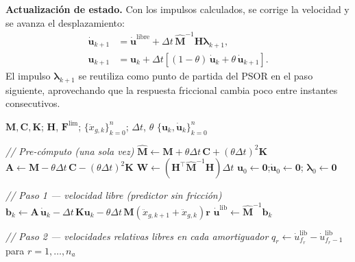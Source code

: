 \documentclass[preprint,12pt,authoryear]{elsarticle}
\begin{document}
\textbf{Actualización de estado.}
Con los impulsos calculados, se corrige la velocidad y se avanza el
desplazamiento:
\begin{align}
    \dot{\bm{u}}_{k+1} &= \dot{\bm{u}}^{\mathrm{libre}}
        + \Delta t\,\hat{\bm{M}}^{-1}\bm{H}\bm{\lambda}_{k+1}, \label{eq:vupdate}\\
    \bm{u}_{k+1} &= \bm{u}_k
        + \Delta t\!\left[(1-\theta)\,\dot{\bm{u}}_k
                         + \theta\,\dot{\bm{u}}_{k+1}\right]. \label{eq:uupdate}
\end{align}
El impulso $\bm{\lambda}_{k+1}$ se reutiliza como punto de partida del PSOR
en el paso siguiente, aprovechando que la respuesta friccional cambia poco
entre instantes consecutivos.

\begin{algorithm}[t]
\caption{NSD-LCP-PSOR aplicado a marcos MDOF con AFR}
\label{alg:nsd-lcp-psor}
\begin{algorithmic}[1]
\Require $\bm{M},\bm{C},\bm{K}$; $\bm{H}$, $\bm{F}^{\lim}$;
         $\{\ddot{x}_{g,k}\}_{k=0}^{n}$; $\Delta t$, $\theta$
\Ensure  $\{\bm{u}_k,\dot{\bm{u}}_k\}_{k=0}^{n}$

\vspace{2pt}
\State \textit{// Pre-cómputo (una sola vez)}
\State $\hat{\bm{M}} \leftarrow \bm{M} + \theta\Delta t\,\bm{C} + (\theta\Delta t)^{2}\bm{K}$
\State $\bm{A} \leftarrow \bm{M} - \theta\Delta t\,\bm{C} - (\theta\Delta t)^{2}\bm{K}$
\State $\bm{W} \leftarrow \left(\bm{H}^{\top}\hat{\bm{M}}^{-1}\bm{H}\right)\Delta t$
\State $\bm{u}_0 \leftarrow \bm{0}$;\quad $\dot{\bm{u}}_0 \leftarrow \bm{0}$;\quad
       $\bm{\lambda}_0 \leftarrow \bm{0}$

\vspace{2pt}
    \vspace{2pt}
    \State \textit{// Paso 1 — velocidad libre (predictor sin fricción)}
    \State $\bm{b}_k \leftarrow \bm{A}\,\dot{\bm{u}}_k
            - \Delta t\,\bm{K}\bm{u}_k
            - \theta\Delta t\,\bm{M}
              \!\left(\ddot{x}_{g,k+1}+\ddot{x}_{g,k}\right)\bm{r}$
    \State $\dot{\bm{u}}^{\mathrm{lib}} \leftarrow \hat{\bm{M}}^{-1}\bm{b}_k$

    \vspace{2pt}
    \State \textit{// Paso 2 — velocidades relativas libres en cada amortiguador}
    \State $q_r \leftarrow \dot{u}^{\mathrm{lib}}_{f_r} - \dot{u}^{\mathrm{lib}}_{f_r-1}$
           \quad para $r = 1,\ldots,n_a$


\end{algorithmic}
\end{algorithm}
\end{document}
